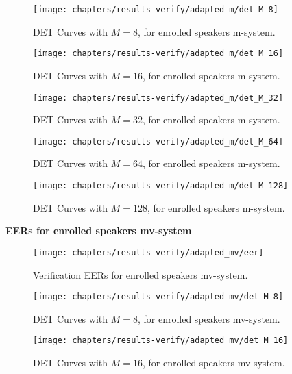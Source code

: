\begin{figure}[ht]
	\centering
	\texttt{[image: chapters/results-verify/adapted\_m/det\_M\_8]}
	\caption{DET Curves with $M = 8$, for enrolled speakers m-system.}
	\label{fig:results-verify-adapted_m-M_8}
\end{figure}

\begin{figure}[ht]
	\centering
	\texttt{[image: chapters/results-verify/adapted\_m/det\_M\_16]}
	\caption{DET Curves with $M = 16$, for enrolled speakers m-system.}
	\label{fig:results-verify-adapted_m-M_16}
\end{figure}

\begin{figure}[ht]
	\centering
	\texttt{[image: chapters/results-verify/adapted\_m/det\_M\_32]}
	\caption{DET Curves with $M = 32$, for enrolled speakers m-system.}
	\label{fig:results-verify-adapted_m-M_32}
\end{figure}

\begin{figure}[ht]
	\centering
	\texttt{[image: chapters/results-verify/adapted\_m/det\_M\_64]}
	\caption{DET Curves with $M = 64$, for enrolled speakers m-system.}
	\label{fig:results-verify-adapted_m-M_64}
\end{figure}

\clearpage
\begin{figure}[ht]
	\centering
	\texttt{[image: chapters/results-verify/adapted\_m/det\_M\_128]}
	\caption{DET Curves with $M = 128$, for enrolled speakers m-system.}
	\label{fig:results-verify-adapted_m-M_128}
\end{figure}

\newpage
\noindent \textbf{EERs for enrolled speakers mv-system}



\begin{figure}[ht]
	\centering
	\texttt{[image: chapters/results-verify/adapted\_mv/eer]}
	\caption{Verification EERs for enrolled speakers  mv-system.}
	\label{fig:results-verify-adapted_mv}
\end{figure}

\begin{figure}[ht]
	\centering
	\texttt{[image: chapters/results-verify/adapted\_mv/det\_M\_8]}
	\caption{DET Curves with $M = 8$, for enrolled speakers mv-system.}
	\label{fig:results-verify-adapted_mv-M_8}
\end{figure}

\begin{figure}[ht]
	\centering
	\texttt{[image: chapters/results-verify/adapted\_mv/det\_M\_16]}
	\caption{DET Curves with $M = 16$, for enrolled speakers mv-system.}
	\label{fig:results-verify-adapted_mv-M_16}
\end{figure}

